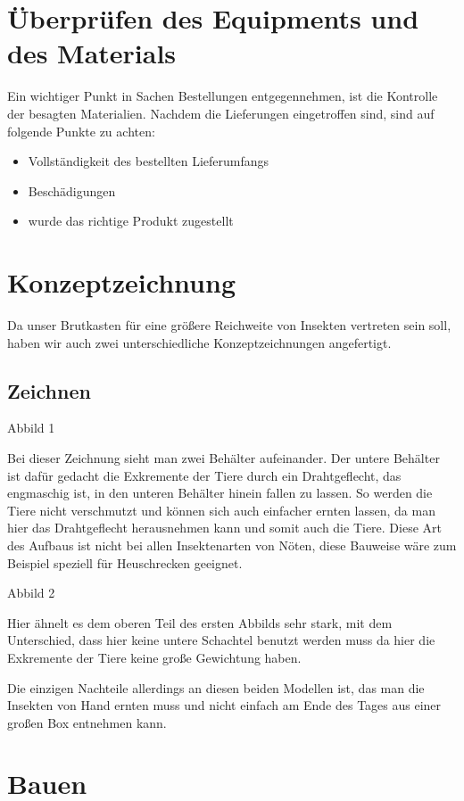 \section{Überprüfen des Equipments und des Materials}
Ein wichtiger Punkt in Sachen Bestellungen entgegennehmen, ist  die Kontrolle der besagten Materialien. Nachdem die Lieferungen eingetroffen sind, sind auf folgende Punkte zu achten:

\begin{itemize}
	\item Vollständigkeit des bestellten Lieferumfangs
	\item Beschädigungen
	\item wurde das richtige Produkt zugestellt
\end{itemize}

\section{Konzeptzeichnung}
Da unser Brutkasten für eine größere Reichweite von Insekten vertreten sein soll, haben wir auch zwei unterschiedliche Konzeptzeichnungen angefertigt.
\subsection{Zeichnen}
Abbild 1 

Bei dieser Zeichnung sieht man zwei Behälter aufeinander. Der untere Behälter ist dafür gedacht die Exkremente der Tiere durch ein Drahtgeflecht, das engmaschig ist, in den unteren Behälter hinein fallen zu lassen. So werden die Tiere nicht verschmutzt und können sich auch einfacher ernten lassen, da man hier das Drahtgeflecht herausnehmen kann und somit auch die Tiere. Diese Art des Aufbaus ist nicht bei allen Insektenarten von Nöten, diese Bauweise wäre zum Beispiel speziell für Heuschrecken geeignet. 

Abbild 2

Hier ähnelt es dem oberen Teil des ersten Abbilds sehr stark, mit dem Unterschied, dass hier keine untere Schachtel benutzt werden muss da hier die Exkremente der Tiere keine große Gewichtung haben. 

Die einzigen Nachteile allerdings an diesen beiden Modellen ist, das man die Insekten von Hand ernten muss und nicht einfach am Ende des Tages aus einer großen Box entnehmen kann.

\section{Bauen}


